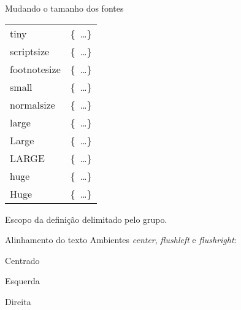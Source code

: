 \begin{frame}{Mudando o tamanho dos fontes}
	\let\tt\ttfamily
	\begin{center}
		\begin{tabular}{ll}
			\pause
			\tiny tiny & \tt\{\string\tiny\ \dots\} \\
			\pause
			\scriptsize scriptsize & \tt\{\string\scriptsize\ \dots\} \\
			\pause
			\footnotesize footnotesize & \tt\{\string\footnotesize\ \dots\} \\
			\pause
			\small small & \tt\{\string\small\ \dots\} \\
			\pause
			\normalsize normalsize &\tt\{\string\normalsize\ \dots\} \\
			\pause
			\large\strut large & \tt\{\string\large\ \dots\} \\
			\pause
			\Large\strut Large & \tt\{\string\Large\ \dots\} \\
			\pause
			\LARGE\strut LARGE & \tt\{\string\LARGE\ \dots\} \\
			\pause
			\huge\strut huge & \tt\{\string\huge\ \dots\} \\
			\pause
			\Huge\strut Huge & \tt\{\string\Huge\ \dots\}
		\end{tabular}
	\end{center}

	\pause
	\begin{Observacao}{}
		Escopo da definição delimitado pelo grupo.
	\end{Observacao}
\end{frame}

\begin{frame}{Alinhamento do texto}
	Ambientes \emph{center}, \emph{flushleft} e \emph{flushright}:

	\begin{center}
		\Huge Centrado
	\end{center}
	\pause

	\begin{flushleft}
		\Huge Esquerda
	\end{flushleft}
	\pause

	\begin{flushright}
		\Huge Direita
	\end{flushright}
\end{frame}

